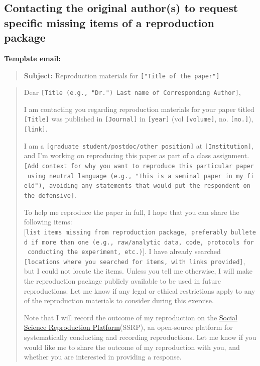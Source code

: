 \documentclass[
]{book}
\begin{document}
\hypertarget{contacting-the-original-authors-to-request-specific-missing-items-of-a-reproduction-package}{%
\subsection{Contacting the original author(s) to request specific missing items of a reproduction package}\label{contacting-the-original-authors-to-request-specific-missing-items-of-a-reproduction-package}}

\textbf{Template email:}

\begin{quote}
\textbf{Subject:} Reproduction materials for \texttt{{[}"Title\ of\ the\ paper"{]}}
\end{quote}

\begin{quote}
Dear \texttt{{[}Title\ (e.g.,\ "Dr.")\ Last\ name\ of\ Corresponding\ Author{]}},

I am contacting you regarding reproduction materials for your paper titled \texttt{{[}Title{]}} was published in \texttt{{[}Journal{]}} in \texttt{{[}year{]}} (vol \texttt{{[}volume{]}}, no. \texttt{{[}no.{]}}), \texttt{{[}link{]}}.

I am a \texttt{{[}graduate\ student/postdoc/other\ position{]}} at \texttt{{[}Institution{]}}, and I'm working on reproducing this paper as part of a class assignment. \texttt{{[}Add\ context\ for\ why\ you\ want\ to\ reproduce\ this\ particular\ paper\ using\ neutral\ language\ (e.g.,\ "This\ is\ a\ seminal\ paper\ in\ my\ field"),\ avoiding\ any\ statements\ that\ would\ put\ the\ respondent\ on\ the\ defensive{]}}.

To help me reproduce the paper in full, I hope that you can share the following items: {[}\texttt{list\ items\ missing\ from\ reproduction\ package,\ preferably\ bulleted\ if\ more\ than\ one\ (e.g.,\ raw/analytic\ data,\ code,\ protocols\ for\ conducting\ the\ experiment,\ etc.)}{]}. I have already searched \texttt{{[}locations\ where\ you\ searched\ for\ items,\ with\ links\ provided{]}}, but I could not locate the items. Unless you tell me otherwise, I will make the reproduction package publicly available to be used in future reproductions. Let me know if any legal or ethical restrictions apply to any of the reproduction materials to consider during this exercise.

Note that I will record the outcome of my reproduction on the \href{https://www.socialsciencereproduction.org/}{Social Science Reproduction Platform}(SSRP), an open-source platform for systematically conducting and recording reproductions. Let me know if you would like me to share the outcome of my reproduction with you, and whether you are interested in providing a response.


\end{quote}
\end{document}
